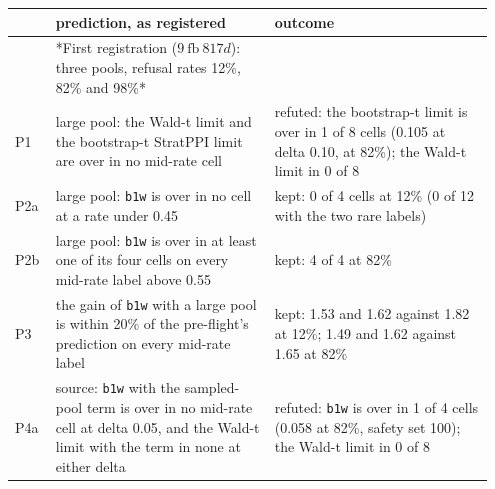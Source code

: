 \documentclass[11pt]{article}
\begin{document}
\begingroup\footnotesize\setlength{\tabcolsep}{4pt}
\begin{longtable}{@{}>{\raggedright\arraybackslash}p{0.087\linewidth}>{\raggedright\arraybackslash}p{0.430\linewidth}>{\raggedright\arraybackslash}p{0.430\linewidth}@{}}
\toprule
 & \textbf{\hspace{0pt}prediction, as registered} & \textbf{\hspace{0pt}outcome} \\
\midrule
\endhead
\bottomrule
\endlastfoot
 & \hspace{0pt}*First registration ($9\ \text{fb}\ 817d$): three pools, refusal rates 12\%, 82\% and 98\%* &  \\
\hspace{0pt}P1 & \hspace{0pt}large pool: the Wald-t limit and the bootstrap-t StratPPI limit are over in no mid-rate cell & \hspace{0pt}refuted: the bootstrap-t limit is over in 1 of 8 cells (0.105 at delta 0.10, at 82\%); the Wald-t limit in 0 of 8 \\
\hspace{0pt}P2a & \hspace{0pt}large pool: \texttt{b1w} is over in no cell at a rate under 0.45 & \hspace{0pt}kept: 0 of 4 cells at 12\% (0 of 12 with the two rare labels) \\
\hspace{0pt}P2b & \hspace{0pt}large pool: \texttt{b1w} is over in at least one of its four cells on every mid-rate label above 0.55 & \hspace{0pt}kept: 4 of 4 at 82\% \\
\hspace{0pt}P3 & \hspace{0pt}the gain of \texttt{b1w} with a large pool is within 20\% of the pre-flight's prediction on every mid-rate label & \hspace{0pt}kept: 1.53 and 1.62 against 1.82 at 12\%; 1.49 and 1.62 against 1.65 at 82\% \\
\hspace{0pt}P4a & \hspace{0pt}source: \texttt{b1w} with the sampled-pool term is over in no mid-rate cell at delta 0.05, and the Wald-t limit with the term in none at either delta & \hspace{0pt}refuted: \texttt{b1w} is over in 1 of 4 cells (0.058 at 82\%, safety set 100); the Wald-t limit in 0 of 8 \\

\end{longtable}
\end{document}
